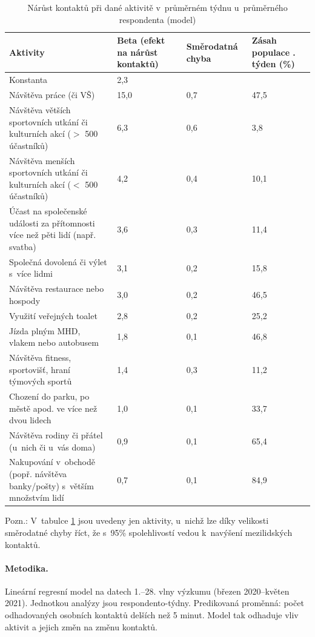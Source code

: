 \begin{table}[ht]
    \centering
    \caption{Nárůst kontaktů při dané aktivitě v průměrném týdnu u~průměrného respondenta (model)}
    
\begin{tabular}{ p{5cm} p{2cm} p{2cm} p{2cm}  }
 \hline
 Aktivity & Beta \newline (efekt na \newline nárůst kontaktů) & Směrodatná \newline chyba & Zásah populace \newline 23. týden (\%)\\
 \hline
 Konstanta   & 2,3    & & \\
 Návštěva práce (či VŠ) & 15,0 & 0,7 &47,5\\
 Návštěva větších sportovních utkání či kulturních akcí ($>$ 500 účastníků) &
6,3 &
0,6 &
3,8\\
  Návštěva menších sportovních utkání či kulturních akcí ($<$ 500 účastníků)&
4,2&
0,4&
10,1\\
  Účast na společenské události za přítomnosti více než pěti lidí (např. svatba)&
3,6&
0,3&
11,4\\
  Společná dovolená či výlet s~více lidmi&
3,1&
0,2&
15,8\\
  Návštěva restaurace nebo hospody&
3,0&
0,2&
46,5\\
  Využití veřejných toalet&
2,8&
0,2&
25,2\\
  Jízda plným MHD, vlakem nebo autobusem&
1,8&
0,1&
46,8\\
  Návštěva fitness, sportovišť, hraní týmových sportů&
1,4&
0,3&
11,2\\
  Chození do parku, po městě apod. ve více než dvou lidech&
1,0&
0,1&
33,7\\
  Návštěva rodiny či přátel (u~nich či u~vás doma)&
0,9&
0,1&
65,4\\
  Nakupování v~obchodě (popř. návštěva banky/pošty) s~větším množstvím lidí&
0,7&
0,1&
84,9\\
 \hline
\end{tabular}
    
    \label{tab:narust-kontaktu}
\end{table}

Pozn.: V tabulce \ref{tab:narust-kontaktu} jsou uvedeny jen aktivity, u~nichž lze díky velikosti smě\-ro\-dat\-né chyby říct, že s~95\% spolehlivostí vedou k navýšení mezilidských kontaktů.

\vspace{1em}
\paragraph{Metodika.} Lineární regresní model na datech 1.--28. vlny výzkumu  (březen 2020–květen 2021). Jednotkou analýzy jsou respondento-týdny. Predikovaná proměnná: počet odhadovaných osobních kontaktů delších než 5 minut. Model tak odhaduje vliv aktivit a jejich změn na změnu kontaktů.

